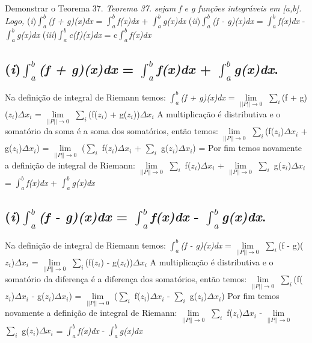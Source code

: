 Demonstrar o Teorema 37.
\newline
\textit{Teorema 37. sejam f e g funções integráveis em [a,b]. Logo,}\newline
(\textit{i})$\int_{a}^{b}$\textit{(f + g)(x)dx} = $\int_{a}^{b}$\textit{f(x)dx} + $\int_{a}^{b}$\textit{g(x)dx}\newline
(\textit{ii})$\int_{a}^{b}$\textit{(f - g)(x)dx} = $\int_{a}^{b}$\textit{f(x)dx} - $\int_{a}^{b}$\textit{g(x)dx}\newline
(\textit{iii})$\int_{a}^{b}$\textit{c(f)(x)dx} = c$\int_{a}^{b}$\textit{f(x)dx}

\subsection{(\textit{i})$\int_{a}^{b}$\textit{(f + g)(x)dx} = $\int_{a}^{b}$\textit{f(x)dx} + $\int_{a}^{b}$\textit{g(x)dx}.}
Na definição de integral de Riemann temos:\newline
$\int_{a}^{b}$\textit{(f + g)(x)}\textit{dx}  = $\lim\limits_{||P||\rightarrow 0}$ $\sum_{i}$(f + g)($z_i$)$\Delta$$x_i$ = $\lim\limits_{||P||\rightarrow 0}$ $\sum_{i}$(f($z_i$) + g($z_i$))$\Delta$$x_i$\newline
A multiplicação é distributiva e o somatório da soma é a soma dos somatórios, então temos: \newline
$\lim\limits_{||P||\rightarrow 0}$ $\sum_{i}$(f($z_i$)$\Delta$$x_i$ + g($z_i$)$\Delta$$x_i$) = $\lim\limits_{||P||\rightarrow 0}$ ($\sum_{i}$ f($z_i$)$\Delta$$x_i$ + $\sum_{i}$ g($z_i$)$\Delta$$x_i$) = \newline
Por fim temos novamente a definição de integral de Riemann:\newline
$\lim\limits_{||P||\rightarrow 0}$ $\sum_{i}$ f($z_i$)$\Delta$$x_i$ + $\lim\limits_{||P||\rightarrow 0}$ $\sum_{i}$ g($z_i$)$\Delta$$x_i$ = 
$\int_{a}^{b}$\textit{f(x)dx} + $\int_{a}^{b}$\textit{g(x)dx}

\subsection{(\textit{i})$\int_{a}^{b}$\textit{(f - g)(x)dx} = $\int_{a}^{b}$\textit{f(x)dx} - $\int_{a}^{b}$\textit{g(x)dx}.}
Na definição de integral de Riemann temos:\newline
$\int_{a}^{b}$\textit{(f - g)(x)}\textit{dx}  = $\lim\limits_{||P||\rightarrow 0}$ $\sum_{i}$(f - g)($z_i$)$\Delta$$x_i$ = $\lim\limits_{||P||\rightarrow 0}$ $\sum_{i}$(f($z_i$) - g($z_i$))$\Delta$$x_i$\newline
A multiplicação é distributiva e o somatório da diferença é a diferença dos somatórios, então temos: \newline
$\lim\limits_{||P||\rightarrow 0}$ $\sum_{i}$(f($z_i$)$\Delta$$x_i$ - g($z_i$)$\Delta$$x_i$) = $\lim\limits_{||P||\rightarrow 0}$ ($\sum_{i}$ f($z_i$)$\Delta$$x_i$ - $\sum_{i}$ g($z_i$)$\Delta$$x_i$) \newline
Por fim temos novamente a definição de integral de Riemann:\newline
$\lim\limits_{||P||\rightarrow 0}$ $\sum_{i}$ f($z_i$)$\Delta$$x_i$ - $\lim\limits_{||P||\rightarrow 0}$ $\sum_{i}$ g($z_i$)$\Delta$$x_i$ = 
$\int_{a}^{b}$\textit{f(x)dx} - $\int_{a}^{b}$\textit{g(x)dx}


